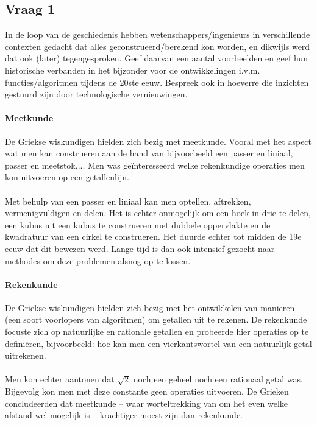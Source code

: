 \documentclass[../main.tex]{subfiles}
\begin{document}
\subsection{Vraag 1}
\begin{question}
In de loop van de geschiedenis hebben wetenschappers/ingenieurs in verschillende
contexten gedacht dat alles geconstrueerd/berekend kon worden, en dikwijls werd 
dat ook (later) tegengesproken. Geef daarvan een aantal voorbeelden en geef hun 
historische verbanden in het bijzonder voor de ontwikkelingen i.v.m. functies/algoritmen 
tijdens de 20ste eeuw. Bespreek ook in hoeverre die inzichten gestuurd zijn door 
technologische vernieuwingen.
\end{question}

\begin{solution}
\paragraph{Meetkunde}
De Griekse wiskundigen hielden zich bezig met meetkunde. Vooral met het aspect
wat men kan construeren aan de hand van bijvoorbeeld een passer en liniaal,
passer en meetstok,... Men was ge\"interesseerd welke rekenkundige operaties
men kon uitvoeren op een getallenlijn.
\paragraph{}
Met behulp van een passer en liniaal kan men optellen, aftrekken, vermenigvuldigen
en delen. Het is echter onmogelijk om een hoek in drie te delen, een kubus uit
een kubus te construeren met dubbele oppervlakte en de kwadratuur van een cirkel
te construeren. Het duurde echter tot midden de 19e eeuw dat dit bewezen werd. Lange
tijd is dan ook intensief gezocht naar methodes om deze problemen alsnog op te lossen.

\paragraph{Rekenkunde}
De Griekse wiskundigen hielden zich bezig met het ontwikkelen van manieren (een soort
voorlopers van algoritmen) om getallen uit te rekenen. De rekenkunde focuste zich
op natuurlijke en rationale getallen en probeerde hier operaties op te defini\"eren,
bijvoorbeeld: hoe kan men een vierkantswortel van een natuurlijk getal uitrekenen.
\paragraph{}
Men kon echter aantonen dat $\sqrt{2}$ noch een geheel noch een rationaal getal
was. Bijgevolg kon men met deze constante geen operaties uitvoeren. De Grieken
concludeerden dat meetkunde -- waar worteltrekking van om het even welke afstand
wel mogelijk is -- krachtiger moest zijn dan rekenkunde.


\end{solution}
\end{document}
